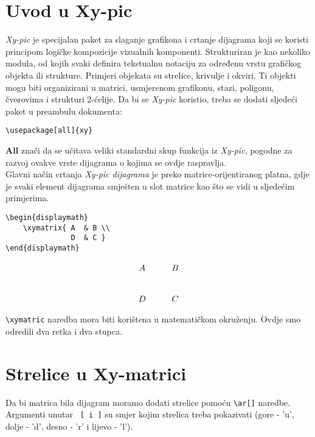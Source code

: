 \documentclass{article}
\begin{document}
\newpage

\section{Uvod u Xy-pic}

\textit{Xy-pic} je specijalan paket za slaganje grafikona i crtanje dijagrama koji se koristi principom logičke kompozicije vizualnih komponenti. Strukturiran je kao nekoliko modula, od kojih svaki definira tekstualnu notaciju za određenu vrstu grafičkog objekta ili strukture. Primjeri objekata su strelice, krivulje i okviri. Ti objekti mogu biti organizirani u matrici, usmjerenom grafikonu, stazi, poligonu, čvorovima i strukturi 2-ćelije. Da bi se \textit{Xy-pic} koristio, treba se dodati sljedeći paket u preambulu dokumenta:

\begin{verbatim}
\usepackage[all]{xy}
\end{verbatim}

\justify
\textbf{All} znači da se učitava veliki standardni skup funkcija iz \textit{Xy-pic}, pogodne za razvoj ovakve vrste dijagrama o kojima se ovdje raspravlja. \\
Glavni način crtanja \textit{Xy-pic dijagrama} je preko matrice-orijentiranog platna, gdje je svaki element dijagrama smješten u slot matrice kao što se vidi u sljedećim primjerima. \\

\begin{center}
\begin{verbatim}
\begin{displaymath}
    \xymatrix{ A  & B \\
               D  & C }
\end{displaymath}
\end{verbatim}

\begin{displaymath}
    \xymatrix{ A  & B \\
               D  & C  }
\end{displaymath}
\end{center}
\justify
\verb|\xymatric| naredba mora biti korištena u matematičkom okruženju. Ovdje smo odredili dva retka i dva stupca.
\newpage

\section{Strelice u Xy-matrici}

 Da bi matrica bila dijagram moramo dodati strelice pomoću \verb|\ar[]| naredbe. Argumenti unutar \verb| [ i ]| su smjer kojim strelica treba pokazivati (gore - 'u', dolje - 'd', desno - 'r' i lijevo - 'l'). \\
\end{document}
